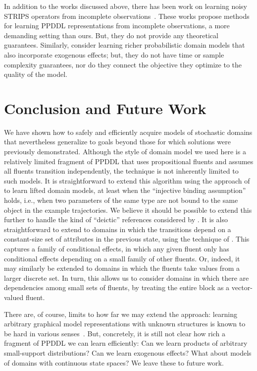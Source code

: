 \documentclass[letterpaper]{article} %
\begin{document}
In addition to the works discussed above, there has been work on learning noisy STRIPS operators from incomplete observations~\cite{pasula2007learning,mourao2012learning,rodrigues2011incremental,ng2019incremental}. These works propose methods for learning PPDDL representations from incomplete observations, a more demanding setting than ours. But, they do not provide any theoretical guarantees. Similarly, \citet{martinez2017relational} consider learning richer probabilistic domain models that also incorporate exogenous effects; but, they do not have time or sample complexity guarantees, nor do they connect the objective they optimize to the quality of the model.

\section{Conclusion and Future Work}
We have shown how to safely and efficiently acquire models of stochastic domains that nevertheless generalize to goals beyond those for which solutions were previously demonstrated. Although the style of domain model we used here is a relatively limited fragment of PPDDL that uses propositional fluents and assumes all fluents transition independently, the technique is not inherently limited to such models. It is straightforward to extend this algorithm using the approach of \citet{juba2021kr} to learn lifted domain models, at least when the ``injective binding assumption'' holds, i.e., when two parameters of the same type are not bound to the same object in the example trajectories. We believe it should be possible to extend this further to handle the kind of ``deictic'' references considered by \citet{pasula2007learning}. It is also straightforward to extend to domains in which the transitions depend on a constant-size set of attributes in the previous state, using the technique of \citet{strehl2007efficient}. This captures a family of conditional effects, in which any given fluent only has conditional effects depending on a small family of other fluents. Or, indeed, it may similarly be extended to domains in which the fluents take values from a larger discrete set. In turn, this allows us to consider domains in which there are dependencies among small sets of fluents, by treating the entire block as a vector-valued fluent. 

There are, of course, limits to how far we may extend the approach: learning arbitrary graphical model representations with unknown structures is known to be hard in various senses~\cite{chickering1996learning,chickering2004large}. But, concretely, it is still not clear how rich a fragment of PPDDL we can learn efficiently: Can we learn products of arbitrary small-support distributions? Can we learn exogenous effects?  What about models of domains with continuous state spaces? We leave these to future work.
\end{document}
